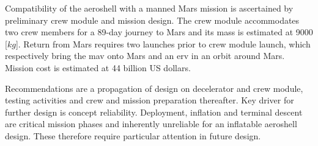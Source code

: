 Compatibility of the aeroshell with a manned Mars mission is ascertained by preliminary crew module and mission design. The crew module accommodates two crew members for a 89-day journey to Mars and its mass is estimated at 9000 [$kg$]. Return from Mars requires two launches prior to crew module launch, which respectively bring the \acrlong{mav} onto Mars and an \acrlong{erv} in an orbit around Mars. Mission cost is estimated at 44 billion US dollars.

Recommendations are a propagation of design on decelerator and crew module, testing activities and crew and mission preparation thereafter. Key driver for further design is concept reliability. Deployment, inflation and terminal descent are critical mission phases and inherently unreliable for an inflatable aeroshell design. These therefore require particular attention in future design.


